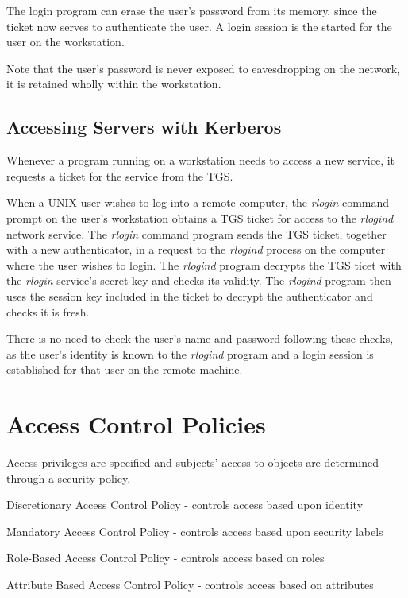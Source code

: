 The login program can erase the user's password from its memory, since the ticket now serves to authenticate the user. A login session is the started for the user on the workstation.

Note that the user's password is never exposed to eavesdropping on the network, it is retained wholly within the workstation. 

\subsection{Accessing Servers with Kerberos}
Whenever a program running on a workstation needs to access a new service, it requests a ticket for the service from the TGS. 

When a UNIX user wishes to log into a remote computer, the \textit{rlogin} command prompt on the user's workstation obtains a TGS ticket for access to the \textit{rlogind} network service. The \textit{rlogin} command program sends the TGS ticket, together with a new authenticator, in a request to the \textit{rlogind} process on the computer where the user wishes to login. The \textit{rlogind} program decrypts the TGS ticet with the \textit{rlogin} service's secret key and checks its validity. The \textit{rlogind} program then uses the session key included in the ticket to decrypt the authenticator and checks it is fresh.

There is no need to check the user's name and password following these checks, as the user's identity is known to the \textit{rlogind} program and a login session is established for that user on the remote machine.

\section{Access Control Policies}
Access privileges are specified and subjects' access to objects are determined through a security policy.
\begin{define}
    \item[DAC] Discretionary Access Control Policy - controls access based upon identity
    \item[MAC] Mandatory Access Control Policy - controls access based upon security labels
    \item[RBAC] Role-Based Access Control Policy - controls access based on roles
    \item[ABAC] Attribute Based Access Control Policy - controls access based on attributes   
\end{define}

